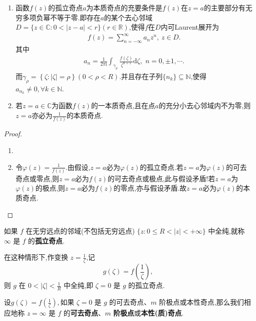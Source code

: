 \documentclass[../../main.tex]{subfiles}%
\begin{document}
\begin{theorem}
\begin{enumerate}[(1)]
\item 函数$f(z)$的孤立奇点$a$为本质奇点的充要条件是$f(z)$在$z=a$的主要部分有无穷多项负幂不等于零.即存在$a$的某个去心邻域$D=\{z\in \mathbb{C} :0<\left| z-a \right|<r\}(r\in \mathbb{R} )$,使得\( f \)在$D$内可Laurent展开为
\begin{align*}
f(z)=\sum_{n=-\infty}^{\infty}{a_n z^n},\ z\in D.
\end{align*}
其中
\begin{align*}
a_n=\frac{1}{2\pi \mathrm{i}}\int_{\gamma _{\rho}}{\frac{f\left( \zeta \right)}{\zeta^{n+1}}\mathrm{d}\zeta},\,\,n=0,\pm 1,\cdots .
\end{align*}
而$\gamma _{\rho}=\left\{ \zeta :\left| \zeta \right|=\rho \right\}(0<\rho <R) .$并且存在子列$\{n_k\}\subseteq \mathbb{N}$,使得$a_{n_k}\neq 0,\forall k\in \mathbb{N}.$

\item 若$z=a\in \mathbb{C}$为函数$f(z)$的一本质奇点,且在点$a$的充分小去心邻域内不为零,则$z=a$亦必为$\frac{1}{f(z)}$的本质奇点.
\end{enumerate}
\end{theorem}
\begin{proof}
\begin{enumerate}[(1)]
\item 
    
\item 令$\varphi(z)=\frac{1}{f(z)}$.由假设,$z=a$必为$\varphi(z)$的孤立奇点.若$z=a$为$\varphi(z)$的可去奇点或零点,则$z=a$必为$f(z)$的可去奇点或极点,此与假设矛盾!若$z=a$为$\varphi(z)$的极点,则$z=a$必为$f(z)$的零点,亦与假设矛盾.故$z=a$必为$\varphi(z)$的本质奇点.
\end{enumerate}

\end{proof}

\begin{definition}
如果 \( f \) 在无穷远点的邻域(不包括无穷远点) \( \{ z: 0 \leqslant R < |z| < +\infty \} \) 中全纯,就称 \( \infty \) 是 \( f \) 的\textbf{孤立奇点}.
\end{definition}
\begin{remark}
在这种情形下,作变换 \( z = \frac{1}{\zeta} \),记
\[
g(\zeta) = f\left( \frac{1}{\zeta} \right),
\]
则 \( g \) 在 \( 0 < |\zeta| < \frac{1}{R} \) 中全纯,即 \( \zeta = 0 \) 是 \( g \) 的孤立奇点.
\end{remark}

\begin{definition}
设$g(\zeta) = f\left( \frac{1}{\zeta} \right),$如果 \( \zeta = 0 \) 是 \( g \) 的可去奇点、\( m \) 阶极点或本性奇点,那么我们相应地称 \( z = \infty \) 是 \( f \) 的\textbf{可去奇点}、\( m \) \textbf{阶极点}或\textbf{本性(质)奇点}.
\end{definition}
\end{document}

